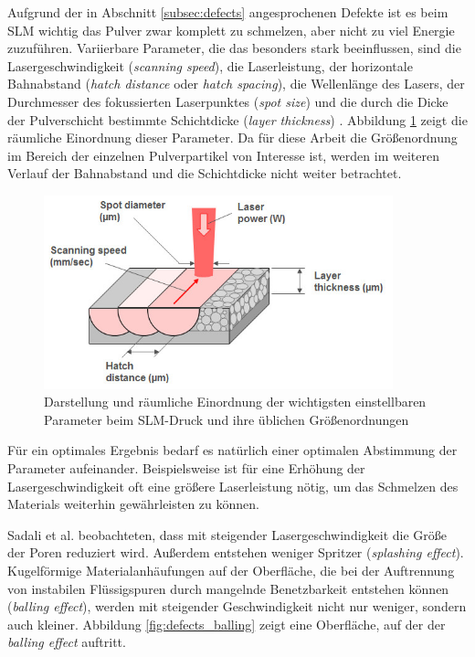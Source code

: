 		Aufgrund der in Abschnitt \ref{subsec:defects} angesprochenen Defekte ist es beim
		SLM wichtig das Pulver zwar komplett zu schmelzen, aber nicht zu viel Energie zuzuführen.
		Variierbare Parameter, die das besonders stark beeinflussen, sind die Lasergeschwindigkeit
		(\emph{scanning speed}), die Laserleistung, der horizontale Bahnabstand
		(\emph{hatch distance} oder \emph{hatch spacing}), die Wellenlänge des Lasers, der
		Durchmesser des fokussierten Laserpunktes (\emph{spot size}) und die durch die Dicke der
		Pulverschicht bestimmte  Schichtdicke (\emph{layer thickness}) \cite{sadali2020influence}.
		Abbildung \ref{fig:slm_parameters} zeigt die räumliche Einordnung dieser Parameter. Da für
		diese Arbeit die Größenordnung im Bereich der einzelnen Pulverpartikel von Interesse ist,
		werden im weiteren Verlauf der Bahnabstand und die Schichtdicke nicht weiter betrachtet.

		\begin{figure}[!ht]
			\centering
			\includegraphics[width=0.9\textwidth]{chapter/main/theory/img/slm_parameters.jpg}
			\caption{Darstellung und räumliche Einordnung der wichtigsten einstellbaren Parameter
			beim SLM-Druck und ihre üblichen Größenordnungen \cite{saunders2017x}}
			\label{fig:slm_parameters}
		\end{figure}

		Für ein optimales Ergebnis bedarf es natürlich einer optimalen Abstimmung der Parameter
		aufeinander. Beispielsweise ist für eine Erhöhung der Lasergeschwindigkeit oft eine
		größere Laserleistung nötig, um das Schmelzen des Materials weiterhin gewährleisten
		zu können.

		Sadali et al. beobachteten, dass mit steigender Lasergeschwindigkeit die Größe der Poren
		reduziert wird. Außerdem entstehen weniger Spritzer (\emph{splashing effect}).
		Kugelförmige Materialanhäufungen auf der Oberfläche, die bei der Auftrennung von
		instabilen Flüssigspuren durch mangelnde Benetzbarkeit entstehen können
		(\emph{balling effect}), werden mit steigender Geschwindigkeit nicht nur weniger, sondern
		auch kleiner. Abbildung \ref{fig:defects_balling} zeigt eine Oberfläche, auf der der
		\emph{balling effect} auftritt.

